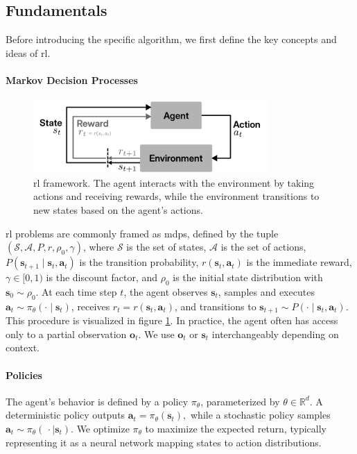 \subsection{Fundamentals}
Before introducing the specific algorithm, we first define the key concepts and ideas of \gls{rl}.
\paragraph{Markov Decision Processes}

\begin{figure}
\centering
\includegraphics[width=0.8\textwidth]{images/figs/rl.pdf}
\caption[ Framework]{\gls{rl} framework. The agent interacts with the environment by taking actions and receiving rewards, while the environment transitions to new states based on the agent's actions.}
\label{fig:rl_diagram}
\end{figure}

\gls{rl} problems are commonly framed as \gls{mdp}s, defined by the tuple \((\mathcal{S}, \mathcal{A}, P, r, \rho_0, \gamma)\), where \(\mathcal{S}\) is the set of states, \(\mathcal{A}\) is the set of actions, \(P(\mathbf{s}_{t+1}\!\mid\!\mathbf{s}_t,\mathbf{a}_t)\) is the transition probability, \(r(\mathbf{s}_t,\mathbf{a}_t)\) is the immediate reward, \(\gamma \in [0,1)\) is the discount factor, and \(\rho_0\) is the initial state distribution with \(\mathbf{s}_0 \sim \rho_0\). At each time step \(t\), the agent observes \(\mathbf{s}_t\), samples and executes \(\mathbf{a}_t \sim \pi_\theta(\cdot\mid \mathbf{s}_t)\), receives \(r_t = r(\mathbf{s}_t,\mathbf{a}_t)\), and transitions to \(\mathbf{s}_{t+1} \sim P(\cdot\mid \mathbf{s}_t,\mathbf{a}_t)\). This procedure is visualized in figure \ref{fig:rl_diagram}. In practice, the agent often has access only to a partial observation \(\mathbf{o}_t\). We use \(\mathbf{o}_t\) or \(\mathbf{s}_t\) interchangeably depending on context.

\paragraph{Policies}
The agent's behavior is defined by a policy \(\pi_{\theta}\), parameterized by \(\theta \in \mathbb{R}^{d}\). A deterministic policy outputs
$ 
\mathbf{a}_t = \pi_{\theta}(\mathbf{s}_t),
$
while a stochastic policy samples
$
\mathbf{a}_t \sim \pi_{\theta}(\,\cdot\mid \mathbf{s}_t).
$
We optimize \(\pi_\theta\) to maximize the expected return, typically representing it as a neural network mapping states to action distributions.

